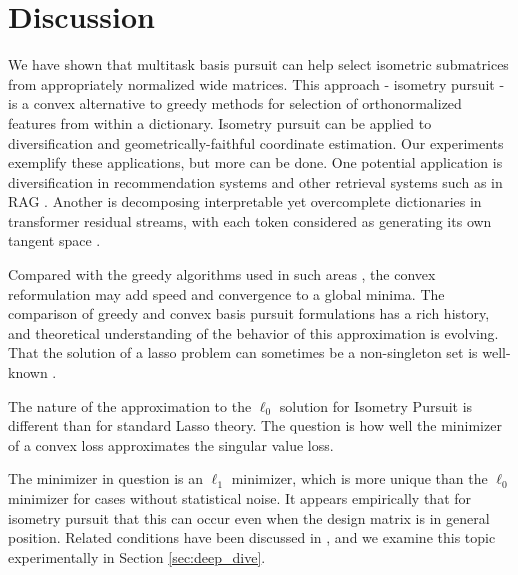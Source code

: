 \section{Discussion}
\label{sec:discussion}

We have shown that multitask basis pursuit can help select isometric submatrices from appropriately normalized wide matrices.
This approach - isometry pursuit - is a convex alternative to greedy methods for selection of orthonormalized features from within a dictionary.
Isometry pursuit can be applied to diversification and geometrically-faithful coordinate estimation.
Our experiments exemplify these applications, but more can be done.
One potential application is diversification in recommendation systems \citep{Carbonell2017-gi, Wu2019-uk, Langchain} and other retrieval systems such as in RAG \citep{Gao2023-cn, Pickett2024-ad, In2024-um, Weiss2024-xm, Vectara}.
Another is decomposing interpretable yet overcomplete dictionaries in transformer residual streams, with each token considered as generating its own tangent space \citep{templeton2024scaling, Makelov2024-bw}.

Compared with the greedy algorithms used in such areas \citep{Carbonell1998-ji, Barioni, Drosou, Qin2012-ok, KUNAVER2017154, Guo-shengbo, Abdool,Yu2016AGA,  Huang2024-wr, Pickett2024-ad}, the convex reformulation may add speed and convergence to a global minima.
The comparison of greedy \cite{Mallat93-wi, Mallat, Pati-93, Tropp05-ml} and convex \citep{Chen2001-hh, Tropp06-sg,Chen2006TheoreticalRO} basis pursuit formulations has a rich history, and theoretical understanding of the behavior of this approximation is evolving.
That the solution of a lasso problem can sometimes be a non-singleton set is well-known \citep{Osborne2000OnTL, DOSSAL2012117, Chrtien2011OnTG, Tibshirani2012TheLP, Ewald2017OnTD, Ali2018TheGL, Schneider2020-qt, Mishkin2022TheSP,Dupuis2019TheGO,Debarre2020OnTU,Everink2024TheGA}.

The nature of the approximation to the $\ell_0$ solution for Isometry Pursuit is different than for standard Lasso theory.
The question is how well the minimizer of a convex loss approximates the singular value loss.


The minimizer in question is an $\ell_1$ minimizer, which is more unique than the $\ell_0$ minimizer for cases without statistical noise.
It appears empirically that for isometry pursuit that this can occur even when the design matrix is in general position.
Related conditions have been discussed in \citet{Donoho2006ForML, Mishkin2022TheSP}, and we examine this topic experimentally in Section \ref{sec:deep_dive}.

